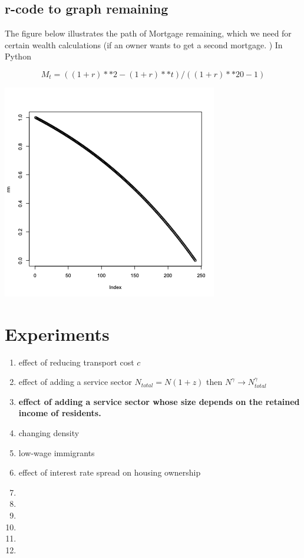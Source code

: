 \subsection{r-code to graph remaining}
The figure below illustrates the path of Mortgage remaining, which we need for certain wealth calculations (if an owner wants to get a second mortgage.
)
In Python 

\[M_t=((1+r)**2-(1+r)**t) / ((1+r)**20-1)\]

\includegraphics[scale=.25]{fig/declining-balance.png}
  
    
\section{Experiments}
  \begin{enumerate}
    \item effect of reducing transport cost $c$
    \item effect of adding a service sector $N_{total} = N(1+z)$ then $N^\gamma \rightarrow  N_{total}^\gamma$
    \item \textbf{effect of adding a service sector whose size depends on the retained income of residents.}
    \item changing density
    \item low-wage immigrants
    \item effect of interest rate spread on housing ownership
    \item 
    \item 
    \item 
    \item 
    \item 
    \item 
    
\end{enumerate} 



